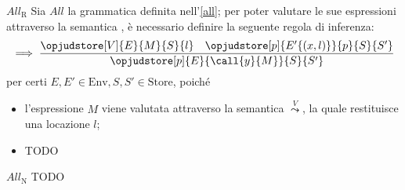 \documentclass[a4paper, 12pt]{report}
\begin{document}
    \begin{framedobs}[label={all r}]{$All_\mathrm{R}$}
        Sia $All$ la grammatica definita nell'\cref{all}; per poter valutare le sue espressioni attraverso la semantica , è necessario definire la seguente regola di inferenza:  $$\implies \dfrac{\opjudstore[V]{E}{M}{S}{l} \quad \opjudstore[p]{E'\{(x,l)\}}{p}{S}{S'}}{\opjudstore[p]{E}{\call{y}{M}}{S}{S'}}$$ per certi $E,E' \in \mathrm{Env}, S,S' \in \mathrm{Store}$, poiché

        \begin{itemize}
            \item l'espressione $M$ viene valutata attraverso la semantica $\stackrel{V}{\leadsto}$, la quale restituisce una locazione $l$;
            \item TODO
        \end{itemize}
    \end{framedobs}

    \begin{framedobs}[label={all n}]{$All_\mathrm{N}$}
        TODO
    \end{framedobs}
\end{document}
